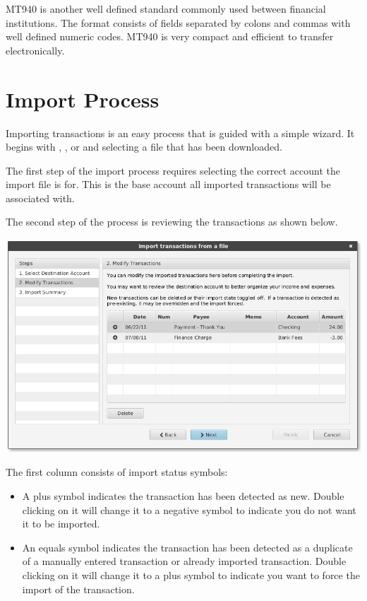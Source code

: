 \documentclass[letterpaper,12pt]{book}
\begin{document}
    MT940 is another well defined standard commonly used between financial institutions.
    The format consists of fields separated by colons and commas with well defined numeric codes.
    MT940 is very compact and efficient to transfer electronically.


    \section{Import Process}
    Importing transactions is an easy process that is guided with a simple wizard.
    It begins with , , or
     and selecting a file that has been downloaded.

    The first step of the import process requires selecting the correct account the
    import file is for. This is the base account all imported transactions will be
    associated with.


    The second step of the process is reviewing the transactions as shown below.

    \includegraphics[width=0.8\linewidth]{images/importWizard2}

    The first column consists of import status symbols:

    \begin{itemize}
        \item A plus symbol indicates the transaction has been detected as new. Double
        clicking on it will change it to a negative symbol to indicate you do not want
        it to be imported.
        \item An equals symbol indicates the transaction has been detected as a duplicate of
        a manually entered transaction or already imported transaction. Double
        clicking on it will change it to a plus symbol to indicate you want to force
        the import of the transaction.
    \end{itemize}
\end{document}
